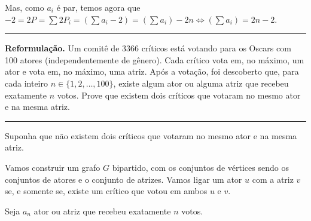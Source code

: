 \documentclass[10pt, a4paper]{article}
\newcommand{\sep}{
	
	\begin{center}
		\vspace{-.6em}
		\rule{10cm}{.5pt}
		\vspace{-.3em}
	\end{center}

}
\begin{document}
	Mas, como $a_i$ é par, temos agora que $-2 = 2P = \sum 2P_i = (\sum a_i - 2) = (\sum a_i) - 2n \iff (\sum a_i) = 2n - 2$.

	\newpage
	\sep

	\textbf{Reformulação.} Um comitê de 3366 críticos está votando para os Oscars com 100 atores (independentemente de gênero). Cada crítico vota em, no máximo, um ator e vota em, no máximo, uma atriz. Após a votação, foi descoberto que, para cada inteiro $n \in \{1, 2, \dots, 100\}$, existe algum ator ou alguma atriz que recebeu exatamente $n$ votos. Prove que existem dois críticos que votaram no mesmo ator e na mesma atriz.

	\sep

	Suponha que não existem dois críticos que votaram no mesmo ator e na mesma atriz.


	Vamos construir um grafo $G$ bipartido, com os conjuntos de vértices sendo os conjuntos de atores e o conjunto de atrizes. Vamos ligar um ator $u$ com a atriz $v$ se, e somente se, existe um crítico que votou em ambos $u$ e $v$. 

	Seja $a_n$ ator ou atriz que recebeu exatamente $n$ votos.

\end{document}

